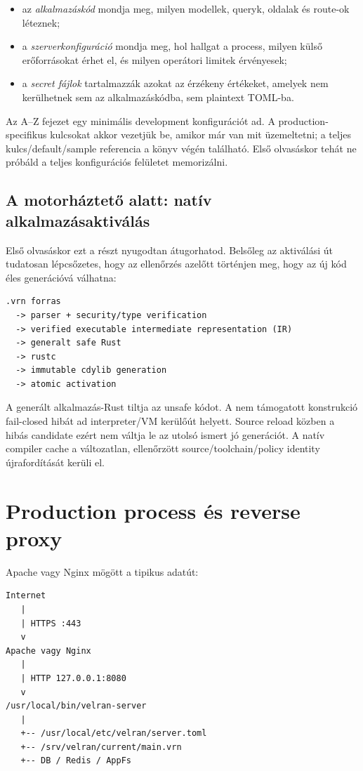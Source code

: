 \begin{itemize}
  \item az \emph{alkalmazáskód} mondja meg, milyen modellek, queryk, oldalak és route-ok léteznek;
  \item a \emph{szerverkonfiguráció} mondja meg, hol hallgat a process, milyen külső erőforrásokat érhet el, és milyen operátori limitek érvényesek;
  \item a \emph{secret fájlok} tartalmazzák azokat az érzékeny értékeket, amelyek nem kerülhetnek sem az alkalmazáskódba, sem plaintext TOML-ba.
\end{itemize}

Az A--Z fejezet egy minimális development konfigurációt ad. A production-specifikus kulcsokat akkor vezetjük be, amikor már van mit üzemeltetni; a teljes kulcs/default/sample referencia a könyv végén található. Első olvasáskor tehát ne próbáld a teljes konfigurációs felületet memorizálni.

\subsection*{A motorháztető alatt: natív alkalmazásaktiválás}

Első olvasáskor ezt a részt nyugodtan átugorhatod. Belsőleg az aktiválási út tudatosan lépcsőzetes, hogy az ellenőrzés azelőtt történjen meg, hogy az új kód éles generációvá válhatna:

\begin{lstlisting}
.vrn forras
  -> parser + security/type verification
  -> verified executable intermediate representation (IR)
  -> generalt safe Rust
  -> rustc
  -> immutable cdylib generation
  -> atomic activation
\end{lstlisting}

A generált alkalmazás-Rust tiltja az unsafe kódot. A nem támogatott konstrukció fail-closed hibát ad interpreter/VM kerülőút helyett. Source reload közben a hibás candidate ezért nem váltja le az utolsó ismert jó generációt. A natív compiler cache a változatlan, ellenőrzött source/toolchain/policy identity újrafordítását kerüli el.

\section{Production process és reverse proxy}

Apache vagy Nginx mögött a tipikus adatút:

\begin{lstlisting}
Internet
   |
   | HTTPS :443
   v
Apache vagy Nginx
   |
   | HTTP 127.0.0.1:8080
   v
/usr/local/bin/velran-server
   |
   +-- /usr/local/etc/velran/server.toml
   +-- /srv/velran/current/main.vrn
   +-- DB / Redis / AppFs
\end{lstlisting}

